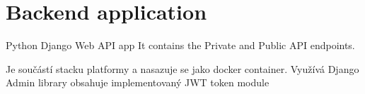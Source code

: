 \section{Backend application}\label{sec:backend-application}
Python Django Web API app %
It contains the Private and Public API endpoints.

Je součástí stacku platformy a nasazuje se jako docker container.
Využívá Django Admin library
obsahuje implementovaný JWT token module
